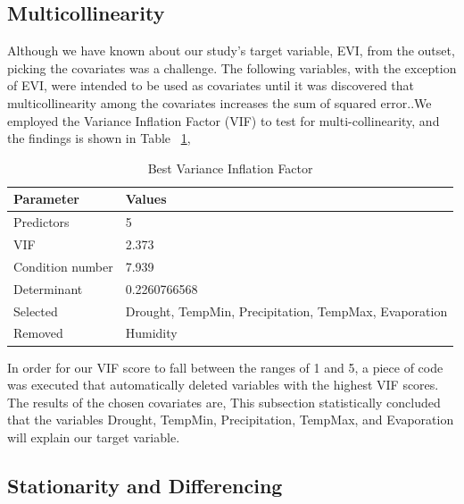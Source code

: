 \subsection{Multicollinearity}
Although we have known about our study's target variable, EVI, from the outset, picking the covariates was a challenge. The following variables, with the exception of EVI, were intended to be used as covariates until it was discovered that multicollinearity among the covariates increases the sum of squared error..We employed the Variance Inﬂation Factor (VIF) to test for multi-collinearity, and the ﬁndings is shown in Table ~\ref{table:VIF},\\

\begin{center}
	\begin{table}
		
	\label{table:VIF}
	\caption{Best Variance Inflation Factor}
	\centering
	\begin{tabular}{|l|l|}
		\hline\hline
		Parameter	& Values \\
		\hline\hline
		Predictors	& 5 \\
		VIF	& 2.373 \\
		Condition number 	& 7.939\\
		Determinant 	& 0.2260766568 \\
		Selected 	& Drought, TempMin, Precipitation, TempMax, Evaporation \\
		Removed 	&  Humidity\\
		\hline
	\end{tabular}
  \end{table}
\end{center}
In order for our VIF score to fall between the ranges of 1 and 5, a piece of code was executed that automatically deleted variables with the highest VIF scores. The results of the chosen covariates are, This subsection statistically concluded that the variables Drought, TempMin, Precipitation, TempMax, and Evaporation will explain our target variable.


\subsection{Stationarity and Differencing}

